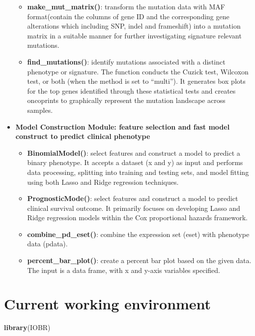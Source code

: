 \documentclass[
  12pt,
]{book}
\newenvironment{Shaded}{\begin{snugshade}}{\end{snugshade}}
\newcommand{\FunctionTok}[1]{\textcolor[rgb]{0.13,0.29,0.53}{\textbf{#1}}}
\newcommand{\NormalTok}[1]{#1}
\providecommand{\tightlist}{%
  \setlength{\itemsep}{0pt}\setlength{\parskip}{0pt}}
\begin{document}
\begin{itemize}
  \begin{itemize}
  \tightlist
  \item
    \textbf{make\_mut\_matrix()}: transform the mutation data with MAF format(contain the columns of gene ID and the corresponding gene alterations which including SNP, indel and frameshift) into a mutation matrix in a suitable manner for further investigating signature relevant mutations.
  \item
    \textbf{find\_mutations()}: identify mutations associated with a distinct phenotype or signature. The function conducts the Cuzick test, Wilcoxon test, or both (when the method is set to ``multi''). It generates box plots for the top genes identified through these statistical tests and creates oncoprints to graphically represent the mutation landscape across samples.
  \end{itemize}
\item
  \textbf{Model Construction Module: feature selection and fast model construct to predict clinical phenotype}

  \begin{itemize}
  \tightlist
  \item
    \textbf{BinomialModel()}: select features and construct a model to predict a binary phenotype. It accepts a dataset (x and y) as input and performs data processing, splitting into training and testing sets, and model fitting using both Lasso and Ridge regression techniques.
  \item
    \textbf{PrognosticMode()}: select features and construct a model to predict clinical survival outcome. It primarily focuses on developing Lasso and Ridge regression models within the Cox proportional hazards framework.
  \item
    \textbf{combine\_pd\_eset()}: combine the expression set (eset) with phenotype data (pdata).
  \item
    \textbf{percent\_bar\_plot()}: create a percent bar plot based on the given data. The input is a data frame, with x and y-axis variables specified.
  \end{itemize}
\end{itemize}

\hypertarget{current-working-environment}{%
\section{Current working environment}\label{current-working-environment}}

\begin{Shaded}
\begin{Highlighting}[]
\FunctionTok{library}\NormalTok{(IOBR)}
\end{Highlighting}
\end{Shaded}
\end{document}
